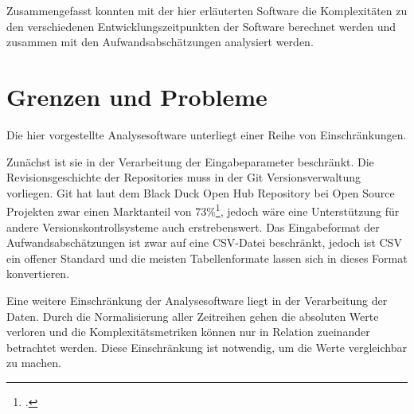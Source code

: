 Zusammengefasst konnten mit der hier erläuterten Software die
Komplexitäten zu den verschiedenen Entwicklungszeitpunkten der Software
berechnet werden und zusammen mit den Aufwandsabschätzungen analysiert
werden.

\section{Grenzen und Probleme}\label{grenzen-und-probleme}

Die hier vorgestellte Analysesoftware unterliegt einer Reihe von
Einschränkungen.

Zunächst ist sie in der Verarbeitung der Eingabeparameter beschränkt.
Die Revisionsgeschichte der Repositories muss in der Git
Versionsverwaltung vorliegen. Git hat laut dem Black Duck Open Hub
Repository bei Open Source Projekten zwar einen Marktanteil von
73\%\footcite[Vgl. ][]{CompareRepositoriesOpen}, jedoch wäre eine Unterstützung
für andere Versionskontrollsysteme auch erstrebenswert. Das
Eingabeformat der Aufwandsabschätzungen ist zwar auf eine \ac{CSV}-Datei
beschränkt, jedoch ist \ac{CSV} ein offener Standard und die meisten
Tabellenformate lassen sich in dieses Format konvertieren.

Eine weitere Einschränkung der Analysesoftware liegt in der Verarbeitung
der Daten. Durch die Normalisierung aller Zeitreihen gehen die absoluten
Werte verloren und die Komplexitätsmetriken können nur in Relation
zueinander betrachtet werden. Diese Einschränkung ist notwendig, um die
Werte vergleichbar zu machen.

